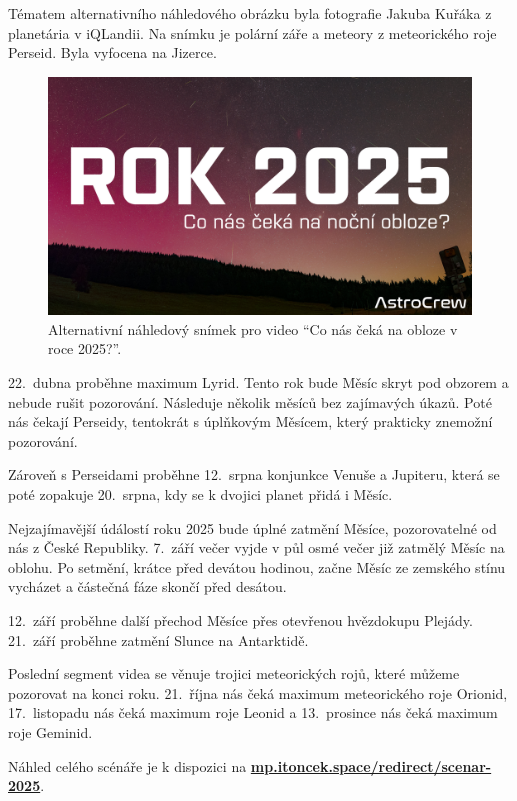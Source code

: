 \documentclass[12pt,a4paper,titlepage]{article}
\newcommand{\link}[2]{\href{#1}{\textcolor{link-color}{\textbf{#2}}}}%
\begin{document}
Tématem alternativního náhledového obrázku byla fotografie Jakuba Kuřáka z planetária v iQLandii. Na snímku je polární záře a meteory z meteorického roje Perseid. Byla vyfocena na Jizerce. 

\begin{figure}[H]
	\centering
	\includegraphics[width=.95\textwidth]{nahledovka-v1.jpg}
	\caption{Alternativní náhledový snímek pro video \enquote{Co nás čeká na obloze v roce 2025?}.}\label{prac:nahledovka-v1}
\end{figure}

22.\ dubna proběhne maximum Lyrid. Tento rok bude Měsíc skryt pod obzorem a nebude rušit pozorování. Následuje několik měsíců bez zajímavých úkazů. Poté nás čekají Perseidy, tentokrát s úplňkovým Měsícem, který prakticky znemožní pozorování.

Zároveň s Perseidami proběhne 12.\ srpna konjunkce Venuše a Jupiteru, která se poté zopakuje 20.\ srpna, kdy se k dvojici planet přidá i Měsíc. 

Nejzajímavější údálostí roku 2025 bude úplné zatmění Měsíce, pozorovatelné od nás z České Republiky. 7.\ září večer vyjde v půl osmé večer již zatmělý Měsíc na oblohu. Po setmění, krátce před devátou hodinou, začne Měsíc ze zemského stínu vycházet a částečná fáze skončí před desátou.

12.\ září proběhne další přechod Měsíce přes otevřenou hvězdokupu Plejády. 21.\ září proběhne zatmění Slunce na Antarktidě.

Poslední segment videa se věnuje trojici meteorických rojů, které můžeme pozorovat na konci roku. 21.\ října nás čeká maximum meteorického roje Orionid, 17.\ listopadu nás čeká maximum roje Leonid a 13.\ prosince nás čeká maximum roje Geminid.

Náhled celého scénáře je k dispozici na \link{https://mp.itoncek.space/redirect/scenar-2025}{mp.itoncek.space/redirect/scenar-2025}.
\end{document}
